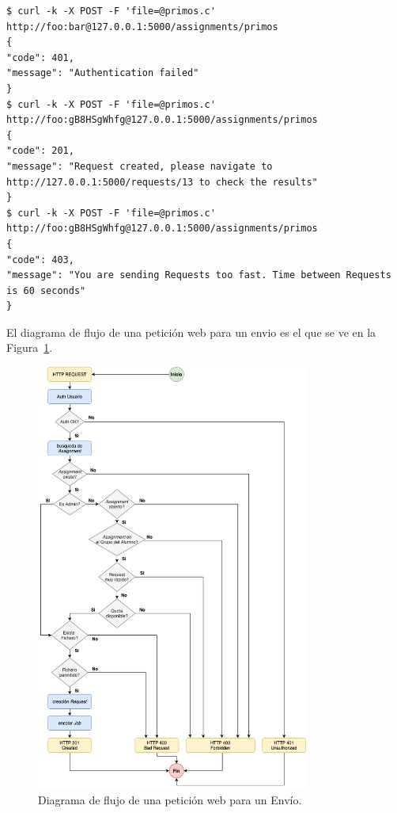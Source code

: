 \documentclass[11pt,spanish,listoffigures,listoftables]{tfgetsinf}
\begin{document}
\begin{lstlisting}[style=ascii-tree]
$ curl -k -X POST -F 'file=@primos.c' http://foo:bar@127.0.0.1:5000/assignments/primos
{
"code": 401,
"message": "Authentication failed"
}
$ curl -k -X POST -F 'file=@primos.c' http://foo:gB8HSgWhfg@127.0.0.1:5000/assignments/primos
{
"code": 201,
"message": "Request created, please navigate to http://127.0.0.1:5000/requests/13 to check the results"
}
$ curl -k -X POST -F 'file=@primos.c' http://foo:gB8HSgWhfg@127.0.0.1:5000/assignments/primos
{
"code": 403,
"message": "You are sending Requests too fast. Time between Requests is 60 seconds"
}
\end{lstlisting}

El diagrama de flujo de una petición web para un \gls{envio} es el que se ve en la Figura~\ref{figura:request-flowchart}.

\begin{figure}[!t]
	\centering
	\includegraphics[width=0.8\textwidth]{img/request-flowchart}
    \caption[Diagrama de flujo de una petición web para un Envío]{Diagrama de flujo de una petición web para un Envío.}
	\label{figura:request-flowchart}
\end{figure}
\end{document}
